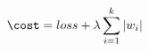 \documentclass[preview]{standalone}
\begin{document}
\begin{align*}
\cost = loss + \lambda\sum_{i=1}^{k}\left|w_{i}\right|
\end{align*}
\end{document}

